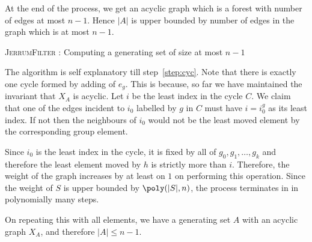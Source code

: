 At the end of the process, we get an acyclic graph which is a forest with
number of edges at most $n-1$. Hence $|A|$ is upper bounded by number of
edges in the graph which is at most $n-1$.

\begin{algorithm}[htp!]
\caption{\textsc{JerrumFilter} : Computing a generating set of size at most
$n-1$}
\label{alg:jerfilter}
\begin{algorithmic}[1] 
		 \label{step:cyc}
		\EndIf
	\EndFor
\EndProcedure
\end{algorithmic}
\end{algorithm}

The algorithm is self explanatory till step~\ref{step:cyc}. Note that there is
exactly one cycle formed by adding of $e_g$. This is because, so far we have
maintained the invariant that $X_A$ is acyclic.
Let $i$ be the least index in the cycle $C$. We claim that
one of the edges incident to $i_0$ labelled by $g$ in $C$ must have $i =
i_0^g$ as its least index.  If not then the
neighbours of $i_0$ would not be the least moved element by the corresponding
group element.

Since $i_0$ is the least index in the cycle, it is fixed by all of 
$g_0, g_1,\ldots, g_k$ and therefore the least element moved by $h$ is
strictly more than $i$. Therefore, the weight of the graph increases by at
least on $1$ on performing this operation. 
Since the weight of $S$ is upper bounded by $\poly(|S|,n)$, the process 
terminates in in polynomially many steps. 
	
On repeating this with all elements, we have a generating set $A$ with an
acyclic graph $X_{A}$, and therefore $|A|\leq n-1$.


